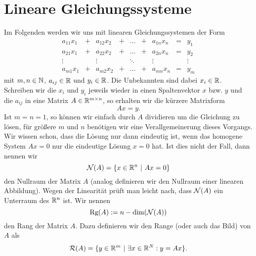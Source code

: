 \section{Lineare Gleichungssysteme}
\label{\detokenize{vektorraeume/LGS:lineare-gleichungssysteme}}\label{\detokenize{vektorraeume/LGS::doc}}
Im Folgenden werden wir uns mit linearen Gleichungssystemen der Form
\begin{equation*}
\begin{matrix}
a_{11} x_1 &+& a_{12}x_2 &+& \ldots &+& a_{1n}x_n &=& y_1 \\
a_{21} x_1 &+& a_{22}x_2 &+& \ldots &+& a_{2n}x_n &=& y_2 \\
\vdots &&  \vdots && \ddots && \vdots && \vdots \\
a_{m1} x_1 &+& a_{m2}x_2 &+& \ldots &+& a_{mn}x_n &=& y_m
\end{matrix}
\end{equation*}
mit \(m,n \in \mathbb{N}\), \(a_{ij} \in \mathbb{R}\) und \(y_i \in \mathbb{R}\). Die Unbekannten sind dabei \(x_i \in \mathbb{R}\). Schreiben wir die \(x_i\) und \(y_i\) jeweils wieder in einen Spaltenvektor \(x\) bzw. \(y\) und die \(a_{ij}\) in eine Matrix \(A \in \mathbb{R}^{m \times n}\), so erhalten wir die kürzere Matrixform
\begin{equation*}
 A x = y .
\end{equation*}
Ist \(m=n=1\), so können wir einfach durch \(A\) dividieren um die Gleichung zu lösen, für größere \(m\) und \(n\) benötigen wir eine Verallgemeinerung dieses Vorgangs.
Wir wissen schon, dass die Lösung nur dann eindeutig ist, wenn das homogene System \(A x = 0\) nur die eindeutige Lösung \(x=0\) hat. Ist dies nicht der Fall, dann nennen wir
\begin{equation*}
 {\cal N}(A) = \{ x \in \mathbb{R}^n ~|~ Ax = 0 \}
\end{equation*}
den Nullraum der Matrix \(A\) (analog definieren wir den Nullraum einer linearen Abbildung). Wegen der Linearität prüft man leicht nach, dass \({\cal N}(A)\) ein Unterraum des \(\mathbb{R}^n\) ist. Wir nennen
\begin{equation*}
 \text{Rg}(A) := n - \text{dim}({\cal N}(A))
\end{equation*}
den Rang der Matrix \(A\). Dazu definieren wir den Range (oder auch das Bild) von \(A\) als
\begin{equation*}
 {\cal R}(A) = \{ y \in \mathbb{R}^m~|~\exists x \in \mathbb{R}^N: y = Ax\}.
\end{equation*}\label{vektorraeume/LGS:example-0}
